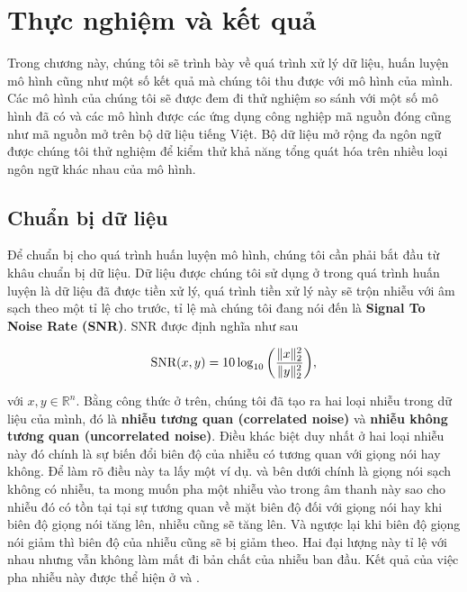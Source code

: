 \newcommand{\reimg}[1]{parts/results/img/#1}
\setupfont{13pt}

\chapter{Thực nghiệm và kết quả}\label{chapter::results}

	Trong chương này, chúng tôi sẽ trình bày về quá trình xử lý dữ liệu, huấn luyện mô hình cũng như một số kết quả mà chúng tôi thu được với mô hình của mình. Các mô hình của chúng tôi sẽ được đem đi thử nghiệm so sánh với một số mô hình đã có và các mô hình được các ứng dụng công nghiệp mã nguồn đóng cũng như mã nguồn mở trên bộ dữ liệu tiếng Việt. Bộ dữ liệu mở rộng đa ngôn ngữ được chúng tôi thử nghiệm để kiểm thử khả năng tổng quát hóa trên nhiều loại ngôn ngữ khác nhau của mô hình.

\section{Chuẩn bị dữ liệu}\label{section::results::data_preparation}
	
	Để chuẩn bị cho quá trình huấn luyện mô hình, chúng tôi cần phải bắt đầu từ khâu chuẩn bị dữ liệu. Dữ liệu được chúng tôi sử dụng ở trong quá trình huấn luyện là dữ liệu đã được tiền xử lý, quá trình tiền xử lý này sẽ trộn nhiễu với âm sạch theo một tỉ lệ cho trước, tỉ lệ mà chúng tôi đang nói đến là \textbf{Signal To Noise Rate (SNR)}. SNR được định nghĩa như sau
	
		\begin{equation}
			\text{SNR}(x, y) = 10\log_{10}\bigg(\frac{\lVert x \rVert^2_2}{\lVert y \rVert^2_2}\bigg),
		\label{re::snr_formula}
		\end{equation}
	
	\noindent với $x, y \in \mathbb{R}^n$. Bằng công thức ở trên, chúng tôi đã tạo ra hai loại nhiễu trong dữ liệu của mình, đó là \textbf{nhiễu tương quan (correlated noise)} và \textbf{nhiễu không tương quan (uncorrelated noise)}. Điều khác biệt duy nhất ở hai loại nhiễu này đó chính là sự biến đổi biên độ của nhiễu có tương quan với giọng nói hay không. Để làm rõ điều này ta lấy một ví dụ.  và  bên dưới chính là giọng nói sạch không có nhiễu, ta mong muốn pha một nhiễu vào trong âm thanh này sao cho nhiễu đó có tồn tại tại sự tương quan về mặt biên độ đối với giọng nói hay khi biên độ giọng nói tăng lên, nhiễu cũng sẽ tăng lên. Và ngược lại khi biên độ giọng nói giảm thì biên độ của nhiễu cũng sẽ bị giảm theo. Hai đại lượng này tỉ lệ với nhau nhưng vẫn không làm mất đi bản chất của nhiễu ban đầu. Kết quả của việc pha nhiễu này được thể hiện ở  và .
	
